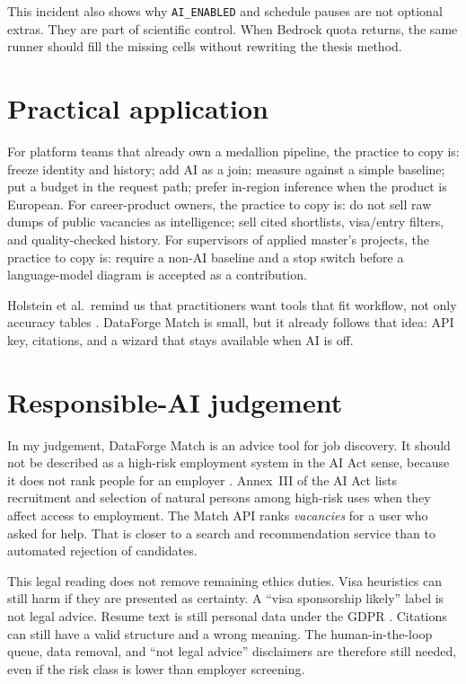 This incident also shows why \texttt{AI\_ENABLED} and schedule pauses are not optional extras. They are part of scientific control. When Bedrock quota returns, the same runner should fill the missing cells without rewriting the thesis method.

\section{Practical application}
\label{sec:practical}

For platform teams that already own a medallion pipeline, the practice to copy is: freeze identity and history; add AI as a join; measure against a simple baseline; put a budget in the request path; prefer in-region inference when the product is European. For career-product owners, the practice to copy is: do not sell raw dumps of public vacancies as intelligence; sell cited shortlists, visa/entry filters, and quality-checked history. For supervisors of applied master's projects, the practice to copy is: require a non-AI baseline and a stop switch before a language-model diagram is accepted as a contribution.

Holstein et al.\ remind us that practitioners want tools that fit workflow, not only accuracy tables . DataForge Match is small, but it already follows that idea: API key, citations, and a wizard that stays available when AI is off.

\section{Responsible-AI judgement}
\label{sec:rai-discussion}

In my judgement, DataForge Match is an advice tool for job discovery. It should not be described as a high-risk employment system in the AI Act sense, because it does not rank people for an employer . Annex~III of the AI Act lists recruitment and selection of natural persons among high-risk uses when they affect access to employment. The Match API ranks \emph{vacancies} for a user who asked for help. That is closer to a search and recommendation service than to automated rejection of candidates.

This legal reading does not remove remaining ethics duties. Visa heuristics can still harm if they are presented as certainty. A ``visa sponsorship likely'' label is not legal advice. Resume text is still personal data under the GDPR . Citations can still have a valid structure and a wrong meaning. The human-in-the-loop queue, data removal, and ``not legal advice'' disclaimers are therefore still needed, even if the risk class is lower than employer screening.

